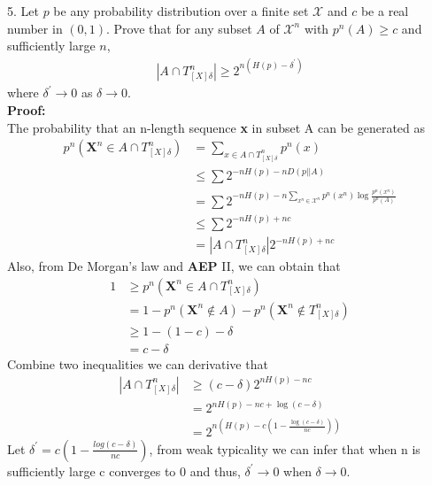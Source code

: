 \documentclass[12pt]{article}
\begin{document}
	5. Let $p$ be any probability distribution over a finite set $\mathcal{X}$ and $c$ be a real number in $(0, 1)$. Prove that for any subset $A$ of $\mathcal{X}^n$ with $p^n(A) \geq c$ and sufficiently large $n$, 
	\begin{align*}
		|A\cap T^n_{[X]\delta}| \geq 2^{n(H(p)-\delta^\prime)}
	\end{align*}
	where $\delta^\prime \rightarrow 0$ as $\delta \rightarrow 0$. \\
	\textbf{Proof:} \\
	The probability that an n-length sequence \textbf{x} in subset A can be generated as
	\begin{align*}
		p^n(\textbf{X}^n\in A\cap T_{[X]\delta}^n) &= \sum_{x\in A\cap T_{[X]\delta}^n} p^n(x)\\
												   &\leq \sum 2^{-nH(p) - nD(p||A)} \\
												   &= \sum 2^{-nH(p) - n\sum_{x^n\in\mathcal{X}^n}p^n(x^n)\log\frac{p^n(x^n)}{p^n(A)}} \\
												   &\leq \sum 2^{-nH(p) +nc} \\
												   &= |A\cap T_{[X]\delta}^n | 2^{-nH(p)+nc}
	\end{align*}
	Also, from De Morgan's law and \textbf{AEP} II, we can obtain that 
	\begin{align*}
		1 &\geq p^n(\textbf{X}^n\in A\cap T_{[X]\delta}^n)\\
		  &= 1 - p^n(\textbf{X}^n \not\in A) - p^n(\textbf{X}^n \not\in T_{[X]\delta}^n) \\
		  &\geq 1 - (1 - c) - \delta \\
		  &= c - \delta
	\end{align*}
	Combine two inequalities we can derivative that 
	\begin{align*}
		|A\cap T_{[X]\delta}^n| &\geq (c - \delta)2^{nH(p)-nc} \\
								&= 2^{nH(p) - nc + \log(c-\delta)} \\
								&= 2^{n(H(p) - c(1-\frac{\log (c-\delta)}{nc}))}
	\end{align*} 
	Let $\delta^\prime = c(1 - \frac{log(c-\delta)}{nc})$, from weak typicality we can infer that when n is sufficiently large c converges to 0 and thus, $\delta^\prime \rightarrow 0$ when $\delta \rightarrow 0$.
	
\end{document}
